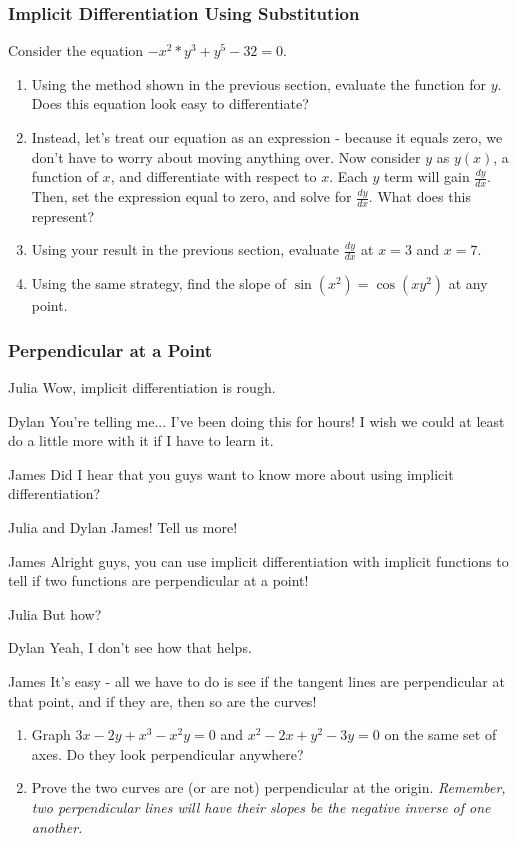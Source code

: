 \documentclass{ximera}
\begin{document}
\subsubsection{Implicit Differentiation Using Substitution}
Consider the equation $-x^2*y^3+y^5-32 = 0$.
\begin{enumerate}
\item{Using the method shown in the previous section, evaluate the function for $y$. Does this equation look easy to differentiate?}
\item{Instead, let's treat our equation as an expression - because it equals zero, we don't have to worry about moving anything over. Now consider $y$ as $y(x)$, a function of $x$, and differentiate with respect to $x$. Each $y$ term will gain $\frac{dy}{dx}$. Then, set the expression equal to zero, and solve for $\frac{dy}{dx}$. What does this represent?}
\item{Using your result in the previous section, evaluate $\frac{dy}{dx}$ at $x = 3$ and $x = 7$.}
\item{Using the same strategy, find the slope of  $\sin(x^2)=\cos(xy^2)$ at any point.}
\end{enumerate}

\subsubsection{Perpendicular at a Point}
\begin{dialogue}
\item[Julia] Wow, implicit differentiation is rough.
\item[Dylan] You're telling me... I've been doing this for hours! I wish we could at least do a little more with it if I have to learn it.
\item[James] Did I hear that you guys want to know more about using implicit differentiation?
\item[Julia and Dylan] James! Tell us more!
\item[James] Alright guys, you can use implicit differentiation with implicit functions to tell if two functions are perpendicular at a point!
\item[Julia] But how?
\item[Dylan] Yeah, I don't see how that helps.
\item[James] It's easy - all we have to do is see if the tangent lines are perpendicular at that point, and if they are, then so are the curves!
\end{dialogue}
\begin{enumerate}
\item{Graph $3x - 2y + x^3-x^2y = 0$ and $x^2 - 2x + y^2 - 3y = 0$ on the same set of axes. Do they look perpendicular anywhere?}
\item{Prove the two curves are (or are not) perpendicular at the origin. \linebreak \textit{Remember, two perpendicular lines will have their slopes be the negative inverse of one another.}}
\end{enumerate}
\end{document}
